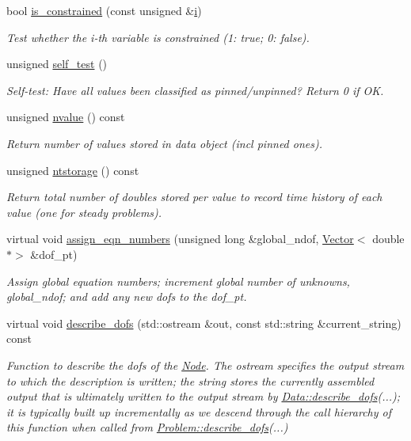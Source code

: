 \begin{DoxyCompactItemize}
bool \hyperlink{classoomph_1_1Data_ac3169455e25c1dc8fd2d3de458c5e101}{is\+\_\+constrained} (const unsigned \&\hyperlink{cfortran_8h_adb50e893b86b3e55e751a42eab3cba82}{i})
\begin{DoxyCompactList}\small\item\em Test whether the i-\/th variable is constrained (1\+: true; 0\+: false). \end{DoxyCompactList}\item 
unsigned \hyperlink{classoomph_1_1Data_ae43b63b56afb8574db6da68f85802f80}{self\+\_\+test} ()
\begin{DoxyCompactList}\small\item\em Self-\/test\+: Have all values been classified as pinned/unpinned? Return 0 if OK. \end{DoxyCompactList}\item 
unsigned \hyperlink{classoomph_1_1Data_a7e67fc78a2e8a2fd6eb75bd292d42ff8}{nvalue} () const
\begin{DoxyCompactList}\small\item\em Return number of values stored in data object (incl pinned ones). \end{DoxyCompactList}\item 
unsigned \hyperlink{classoomph_1_1Data_a9752205c5fb3bb886200b3fae9181e94}{ntstorage} () const
\begin{DoxyCompactList}\small\item\em Return total number of doubles stored per value to record time history of each value (one for steady problems). \end{DoxyCompactList}\item 
virtual void \hyperlink{classoomph_1_1Data_a7b26834562644d212f8bb5c7ed482c61}{assign\+\_\+eqn\+\_\+numbers} (unsigned long \&global\+\_\+ndof, \hyperlink{classoomph_1_1Vector}{Vector}$<$ double $\ast$$>$ \&dof\+\_\+pt)
\begin{DoxyCompactList}\small\item\em Assign global equation numbers; increment global number of unknowns, global\+\_\+ndof; and add any new dofs to the dof\+\_\+pt. \end{DoxyCompactList}\item 
virtual void \hyperlink{classoomph_1_1Data_a2dae16e2dcff9a40029f834c83364df5}{describe\+\_\+dofs} (std\+::ostream \&out, const std\+::string \&current\+\_\+string) const
\begin{DoxyCompactList}\small\item\em Function to describe the dofs of the \hyperlink{classoomph_1_1Node}{Node}. The ostream specifies the output stream to which the description is written; the string stores the currently assembled output that is ultimately written to the output stream by \hyperlink{classoomph_1_1Data_a2dae16e2dcff9a40029f834c83364df5}{Data\+::describe\+\_\+dofs}(...); it is typically built up incrementally as we descend through the call hierarchy of this function when called from \hyperlink{classoomph_1_1Problem_abc103804eb319ae0b3d43870cc3e1eaf}{Problem\+::describe\+\_\+dofs}(...) \end{DoxyCompactList}\item 
$$
\end{DoxyCompactItemize}
